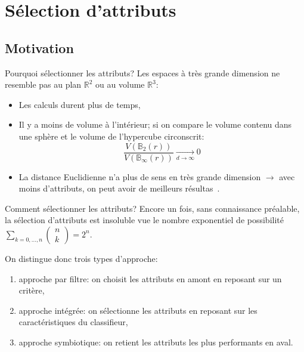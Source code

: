 \documentclass[8pt]{beamer}
\begin{document}
	\section[feature selection]{Sélection d'attributs}
	\subsection[motivation]{Motivation}
	\begin{frame}{Pourquoi sélectionner les attributs?}
		Les espaces à très grande dimension ne resemble pas au plan $\mathbb{R}^2$ ou au volume  $\mathbb{R}^3$:
		\begin{itemize}
			\item <1-> Les calculs durent plus de temps,
			\item <2-> Il y a moins de volume à l'intérieur; si on compare le volume contenu dans une sphère et le volume de l'hypercube circonscrit:
			$$\frac{V(\mathbb{B}_{2}(r))}{V(\mathbb{B}_{\infty}(r))}\xrightarrow[d \to \infty]{} 0$$
			\item <3-> La distance Euclidienne n'a plus de sens en très grande dimension $\longrightarrow$ avec moins d'attributs, on peut avoir de meilleurs résultas~\cite{Domingos:2012:FUT:2347736.2347755}.
		\end{itemize}
	\end{frame}

	\begin{frame}{Comment sélectionner les attributs?}
		Encore un fois, sans connaissance préalable, la sélection d'attributs est insoluble vue le nombre exponentiel de possibilité $\sum_{k=0,\dots,n} \begin{pmatrix}
		n\\
		k
		\end{pmatrix} = 2^n$.

		On distingue donc trois types d'approche:
		\begin{enumerate}
			\item<1-> approche par filtre: on choisit les attributs en amont en reposant sur un critère,
			\item<2-> approche intégrée: on sélectionne les attributs en reposant sur les caractéristiques du classifieur,
			\item<3-> approche symbiotique: on retient les attributs les plus performants en aval.
		\end{enumerate}
	\end{frame}
\end{document}
